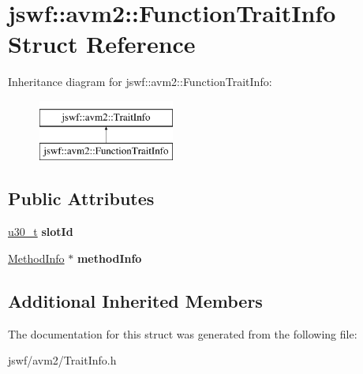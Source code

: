 \hypertarget{structjswf_1_1avm2_1_1_function_trait_info}{\section{jswf\+:\+:avm2\+:\+:Function\+Trait\+Info Struct Reference}
\label{structjswf_1_1avm2_1_1_function_trait_info}
}
Inheritance diagram for jswf\+:\+:avm2\+:\+:Function\+Trait\+Info\+:\begin{figure}[H]
\begin{center}
\leavevmode
\includegraphics[height=2.000000cm]{structjswf_1_1avm2_1_1_function_trait_info}
\end{center}
\end{figure}
\subsection*{Public Attributes}
\begin{DoxyCompactItemize}
\item 
\hypertarget{structjswf_1_1avm2_1_1_function_trait_info_a44eb1f8750542e2a1c2a777ed5b6922d}{\hyperlink{namespacejswf_aa10d9ddca2a6a5debdc261dfae3d1117}{u30\+\_\+t} {\bfseries slot\+Id}}\label{structjswf_1_1avm2_1_1_function_trait_info_a44eb1f8750542e2a1c2a777ed5b6922d}

\item 
\hypertarget{structjswf_1_1avm2_1_1_function_trait_info_a9a2b872427c231cc6b848ed17ac58f18}{\hyperlink{structjswf_1_1avm2_1_1_method_info}{Method\+Info} $\ast$ {\bfseries method\+Info}}\label{structjswf_1_1avm2_1_1_function_trait_info_a9a2b872427c231cc6b848ed17ac58f18}

\end{DoxyCompactItemize}
\subsection*{Additional Inherited Members}


The documentation for this struct was generated from the following file\+:\begin{DoxyCompactItemize}
\item 
jswf/avm2/Trait\+Info.\+h\end{DoxyCompactItemize}
